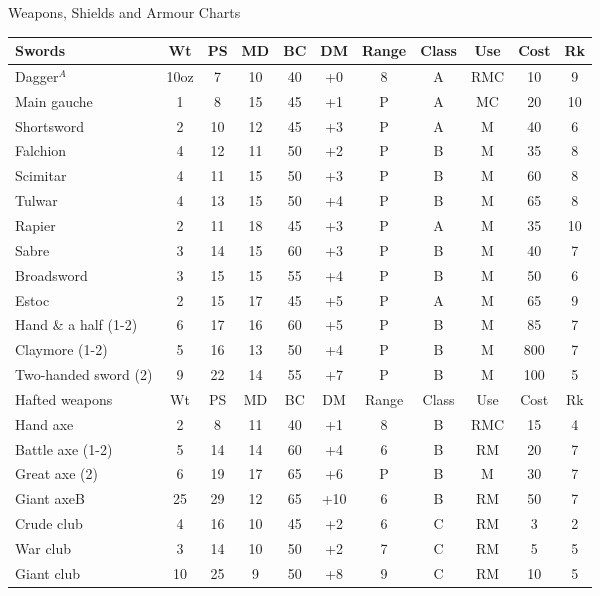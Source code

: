 \begin{Tables}{Weapons, Shields and Armour Charts}
\begingroup

\def\arraystretch{0.80}

\begin{tabularx}{\linewidth}{Xcccccccccc} \toprule
Swords			& Wt	& PS	& MD	& BC	& DM	& Range	& Class	& Use	& Cost	& Rk	\\ \midrule
Dagger$^A$		& 10oz	& 7	& 10	& 40	& +0 	& 8	& A	& RMC	& 10	& 9	\\ \hline
Main gauche		& 1	& 8	& 15	& 45	& +1	& P	& A	& MC	& 20	& 10	\\ \hline
Shortsword		& 2	& 10	& 12	& 45	& +3	& P	& A	& M	& 40	& 6	\\ \hline
Falchion		& 4	& 12	& 11	& 50	& +2	& P	& B	& M	& 35	& 8	\\ \hline
Scimitar		& 4	& 11	& 15	& 50	& +3	& P	& B	& M	& 60	& 8	\\ \hline
Tulwar			& 4	& 13	& 15	& 50	& +4	& P	& B	& M	& 65	& 8	\\ \hline
Rapier			& 2	& 11	& 18	& 45	& +3	& P	& A	& M	& 35	& 10	\\ \hline
Sabre			& 3	& 14	& 15	& 60	& +3	& P	& B	& M	& 40	& 7	\\ \hline
Broadsword		& 3	& 15	& 15	& 55	& +4	& P	& B	& M	& 50	& 6	\\ \hline
Estoc			& 2	& 15	& 17	& 45	& +5	& P	& A	& M	& 65	& 9	\\ \hline
Hand \& a half (1-2)	& 6	& 17	& 16	& 60	& +5	& P	& B	& M	& 85	& 7	\\ \hline
Claymore (1-2)		& 5	& 16	& 13	& 50	& +4	& P	& B	& M	& 800	& 7	\\ \hline
Two-handed sword (2)	& 9	& 22	& 14	& 55	& +7	& P	& B	& M	& 100	& 5	\\ \midrule
Hafted weapons		& Wt	& PS	& MD	& BC	& DM	& Range	& Class	& Use	& Cost	& Rk	\\ \midrule
Hand axe		& 2	& 8	& 11	& 40	& +1	& 8	& B	& RMC	& 15	& 4	\\ \hline
Battle axe (1-2)	& 5 	& 14	& 14	& 60	& +4	& 6	& B	& RM	& 20	& 7	\\ \hline
Great axe (2)		& 6	& 19	& 17	& 65	& +6	& P	& B	& M	& 30	& 7	\\ \hline
Giant axeB		& 25	& 29	& 12	& 65	& +10	& 6	& B	& RM	& 50	& 7	\\ \hline
Crude club		& 4	& 16	& 10	& 45	& +2	& 6	& C	& RM	& 3	& 2	\\ \hline
War club		& 3	& 14	& 10	& 50	& +2	& 7	& C	& RM	& 5	& 5	\\ \hline
Giant club		& 10	& 25	& 9	& 50	& +8	& 9	& C	& RM	& 10	& 5	\\ \hline

\end{tabularx}
\end{Tables}
